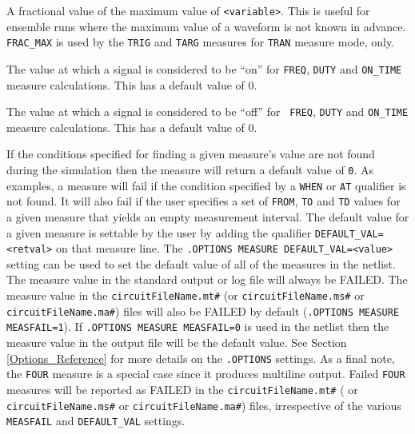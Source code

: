\begin{Command}
\begin{Arguments}

A fractional value of the maximum value of \texttt{<variable>}.  This
is useful for ensemble runs where the maximum value of a waveform is
not known in advance.  {\tt FRAC\_MAX} is used by the {\tt TRIG} and
{\tt TARG} measures for {\tt TRAN} measure mode, only.


The value at which a signal is considered to be ``on'' for {\tt FREQ},
{\tt DUTY} and {\tt ON\_TIME} measure calculations.  This has a
default value of 0.


The value at which a signal is considered to be ``off'' for {\tt
FREQ}, {\tt DUTY} and {\tt ON\_TIME} measure calculations.  This has a
default value of 0.


If the conditions specified for finding a given measure's value are not found
during the simulation then the measure will return a default value of {\tt 0}.
As examples, a measure will fail if the condition specified by a {\tt WHEN} or
{\tt AT} qualifier is not found.  It will also fail if the user specifies a
set of {\tt FROM}, {\tt TO} and {\tt TD} values for a given measure that 
yields an empty measurement interval. The default value for a given measure
is settable by the user by adding the qualifier {\tt DEFAULT\_VAL=<retval>}
on that measure line.  The \texttt{.OPTIONS MEASURE DEFAULT\_VAL=<value>}
setting can be used to set the default value of all of the measures in the
netlist. The measure value in the standard output or log file will always
be FAILED. The measure value in the \texttt{circuitFileName.mt\#}
(or \texttt{circuitFileName.ms\#} or \texttt{circuitFileName.ma\#}) files will
also be FAILED by default (\texttt{.OPTIONS MEASURE MEASFAIL=1}).  If 
\texttt{.OPTIONS MEASURE MEASFAIL=0} is used in the netlist then the
measure value in the output file will be the default value. See Section
\ref{Options_Reference} for more details on the \texttt{.OPTIONS} settings.
 As a final note, the \texttt{FOUR} measure is a special case since it produces
multiline output.  Failed \texttt{FOUR} measures will be reported as FAILED in the
\texttt{circuitFileName.mt\#} ( or \texttt{circuitFileName.ms\#} or
\texttt{circuitFileName.ma\#}) files, irrespective of the various
\texttt{MEASFAIL} and \texttt{DEFAULT\_VAL} settings.



\end{Arguments}
\end{Command}
